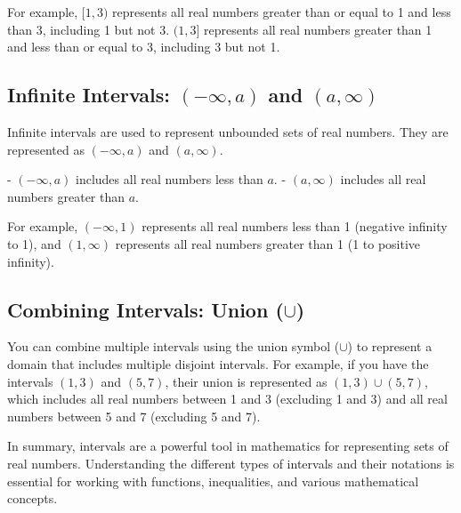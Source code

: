 For example, $[1, 3)$ represents all real numbers greater than or equal to 1 and less than 3, including 1 but not 3. $(1, 3]$ represents all real numbers greater than 1 and less than or equal to 3, including 3 but not 1.

\subsection{Infinite Intervals: $(-\infty, a)$ and $(a, \infty)$}

Infinite intervals are used to represent unbounded sets of real numbers. They are represented as $(-\infty, a)$ and $(a, \infty)$.

- $(-\infty, a)$ includes all real numbers less than $a$.
- $(a, \infty)$ includes all real numbers greater than $a$.

For example, $(-\infty, 1)$ represents all real numbers less than 1 (negative infinity to 1), and $(1, \infty)$ represents all real numbers greater than 1 (1 to positive infinity).

\subsection{Combining Intervals: Union ($\cup$)}

You can combine multiple intervals using the union symbol ($\cup$) to represent a domain that includes multiple disjoint intervals. For example, if you have the intervals $(1, 3)$ and $(5, 7)$, their union is represented as $(1, 3) \cup (5, 7)$, which includes all real numbers between 1 and 3 (excluding 1 and 3) and all real numbers between 5 and 7 (excluding 5 and 7).

In summary, intervals are a powerful tool in mathematics for representing sets of real numbers. Understanding the different types of intervals and their notations is essential for working with functions, inequalities, and various mathematical concepts.
